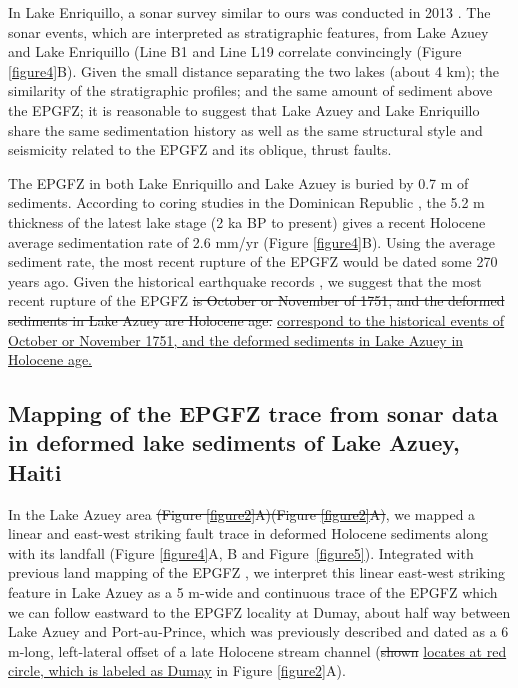 \documentclass[linenumbers,draft]{agujournal}
\providecommand{\DIFdel}[1]{{\protect\color{red}\sout{#1}}}                      %
\providecommand{\DIFaddbegin}{} %
\providecommand{\DIFaddend}{} %
\providecommand{\DIFdelbegin}{} %
\providecommand{\DIFdelend}{} %
\begin{document}
In Lake Enriquillo, a sonar survey similar to ours was conducted in 2013 \citep{rios2013holocene}. The sonar events, which are interpreted as stratigraphic features, from Lake Azuey and Lake Enriquillo (Line B1 and Line L19 correlate convincingly (Figure \ref{figure4}B). Given the small distance separating the two lakes (about 4 km); the similarity of the stratigraphic profiles; and the same amount of sediment above the EPGFZ; it is reasonable to suggest that Lake Azuey and Lake Enriquillo share the same sedimentation history as well as the same structural style and seismicity related to the EPGFZ and its oblique, thrust faults.

The EPGFZ in both Lake Enriquillo and Lake Azuey is buried by 0.7 m of sediments. According to coring studies in the Dominican Republic \citep{taylor1985stratigraphy,rios2013holocene}, the 5.2 m thickness of the latest lake stage (2 ka BP to present) gives a recent Holocene average sedimentation rate of 2.6 mm/yr (Figure \ref{figure4}B). Using the average sediment rate, the most recent rupture of the EPGFZ would be dated some 270 years ago. Given the historical earthquake records \citep{bakun2012significant}, we suggest that the most recent rupture of the EPGFZ \DIFdelbegin \DIFdel{is October or November of 1751, and the deformed sediments in Lake Azuey are Holocene age.
}\DIFdelend \DIFaddbegin \ul{correspond to the historical events of October or November 1751, and the deformed sediments in Lake Azuey in Holocene age.}
\DIFaddend 

\subsection{Mapping of the EPGFZ trace from sonar data in deformed lake sediments of Lake Azuey, Haiti}
In the Lake Azuey area \DIFdelbegin \DIFdel{(Figure \ref{figure2}A)}\DIFdelend \DIFaddbegin \st{(Figure {\ref{figure2}}A)}\DIFaddend , we mapped a linear and east-west striking fault trace in deformed Holocene sediments along with its landfall (Figure \ref{figure4}A, B and Figure~\ref{figure5}). Integrated with previous land mapping of the EPGFZ \citep{bourgueil1988synthese,mann1995actively,prentice2010seismic,cowgill2012interactive}, we interpret this linear east-west striking feature in Lake Azuey as a 5 m-wide and continuous trace of the EPGFZ which we can follow eastward to the EPGFZ locality at Dumay, about half way between Lake Azuey and Port-au-Prince, which was previously described and dated as a 6 m-long, left-lateral offset of a late Holocene stream channel \citep{cowgill2012interactive} (\DIFdelbegin \DIFdel{shown }\DIFdelend \DIFaddbegin \ul{locates at red circle, which is labeled as Dumay} \DIFaddend in Figure \ref{figure2}A). 
\end{document}
